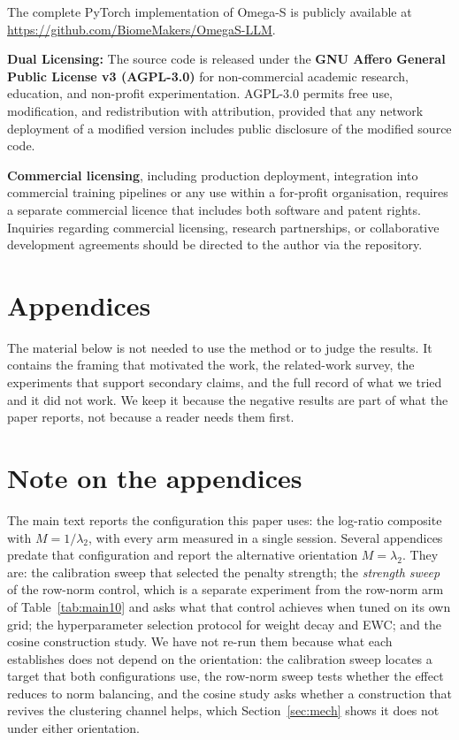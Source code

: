 \documentclass[11pt,a4paper]{article}
\begin{document}
The complete PyTorch implementation of Omega-S is publicly available at
\url{https://github.com/BiomeMakers/OmegaS-LLM}.

\textbf{Dual Licensing:} The source code is released under the
\textbf{GNU Affero General Public License v3 (AGPL-3.0)} for non-commercial
academic research, education, and non-profit experimentation. AGPL-3.0
permits free use, modification, and redistribution with attribution,
provided that any network deployment of a modified version includes public
disclosure of the modified source code.

\textbf{Commercial licensing}, including production deployment, integration
into commercial training pipelines or any use within a for-profit
organisation, requires a separate commercial licence that includes both
software and patent rights. Inquiries
regarding commercial licensing, research partnerships, or collaborative
development agreements should be directed to the author via the repository.


\appendix
\section*{Appendices}

\noindent The material below is not needed to use the method or to judge the
results. It contains the framing that motivated the work, the related-work
survey, the experiments that support secondary claims, and the full record of
what we tried and it did not work. We keep it because the negative results are
part of what the paper reports, not because a reader needs them first.

\section*{Note on the appendices}

The main text reports the configuration this paper uses: the log-ratio
composite with $M = 1/\lambda_2$, with every arm measured in a single session.
Several appendices predate that configuration and report the alternative
orientation $M = \lambda_2$. They are: the calibration sweep that selected the
penalty strength; the \emph{strength sweep} of the row-norm control, which is a
separate experiment from the row-norm arm of Table~\ref{tab:main10} and asks
what that control achieves when tuned on its own grid; the hyperparameter
selection protocol for weight decay and EWC; and the cosine construction study.
We have not re-run them because what each establishes does not depend on the
orientation: the calibration sweep locates a target that both configurations
use, the row-norm sweep tests whether the effect reduces to norm balancing, and
the cosine study asks whether a construction that revives the clustering channel
helps, which Section~\ref{sec:mech} shows it does not under either orientation.
\end{document}
